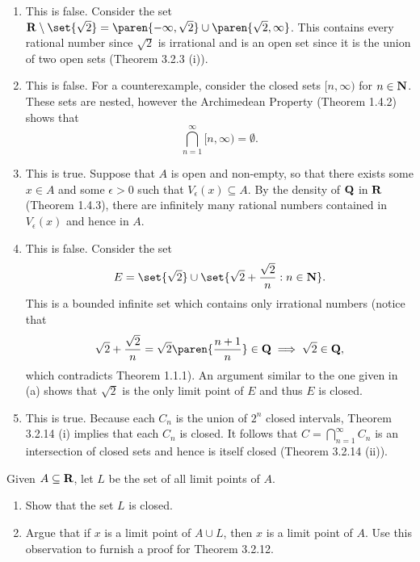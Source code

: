 \documentclass{lew98_solutions}
\begin{document}
\begin{solution}
    \begin{enumerate}
        \item This is false. Consider the set \( \R \setminus \set{ \sqrt{2} } = \paren{ -\infty, \sqrt{2} } \cup \paren{ \sqrt{2}, \infty } \). This contains every rational number since \( \sqrt{2} \) is irrational and is an open set since it is the union of two open sets (Theorem 3.2.3 (i)).
        
        \item This is false. For a counterexample, consider the closed sets \( [n, \infty) \) for \( n \in \mathbf{N} \). These sets are nested, however the Archimedean Property (Theorem 1.4.2) shows that
        \[
            \bigcap_{n=1}^{\infty} [n, \infty) = \emptyset.
        \]

        \item This is true. Suppose that \( A \) is open and non-empty, so that there exists some \( x \in A \) and some \( \epsilon > 0 \) such that \( V_{\epsilon}(x) \subseteq A \). By the density of \( \mathbf{Q} \) in \( \mathbf{R} \) (Theorem 1.4.3), there are infinitely many rational numbers contained in \( V_{\epsilon}(x) \) and hence in \( A \).

        \item This is false. Consider the set
        \[
            E = \set{ \sqrt{2} } \cup \set{ \sqrt{2} + \frac{\sqrt{2}}{n} : n \in \N }.
        \]
        This is a bounded infinite set which contains only irrational numbers (notice that
        \[
            \sqrt{2} + \frac{\sqrt{2}}{n} = \sqrt{2} \paren{ \frac{n+1}{n} } \in \Q \implies \sqrt{2} \in \Q,
        \]
        which contradicts Theorem 1.1.1). An argument similar to the one given in  (a) shows that \( \sqrt{2} \) is the only limit point of \( E \) and thus \( E \) is closed.

        \item This is true. Because each \( C_n \) is the union of \( 2^n \) closed intervals, Theorem 3.2.14 (i) implies that each \( C_n \) is closed. It follows that \( C = \bigcap_{n=1}^{\infty} C_n \) is an intersection of closed sets and hence is itself closed (Theorem 3.2.14 (ii)).
    \end{enumerate}
\end{solution}

\begin{exercise}
\label{ex:3.2.7}
    Given \( A \subseteq \mathbf{R} \), let \( L \) be the set of all limit points of \( A \).
    \begin{enumerate}
        \item Show that the set \( L \) is closed.

        \item Argue that if \( x \) is a limit point of \( A \cup L \), then \( x \) is a limit point of \( A \). Use this observation to furnish a proof for Theorem 3.2.12.
    \end{enumerate}
\end{exercise}
\end{document}
